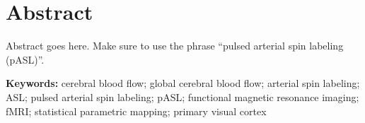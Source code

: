 \section{Abstract}
Abstract goes here.  Make sure to use the phrase ``pulsed arterial spin labeling (pASL)''.

\textbf{Keywords:} cerebral blood flow; global cerebral blood flow; arterial spin labeling; ASL; pulsed arterial spin labeling; pASL; functional magnetic resonance imaging; fMRI; statistical parametric mapping; primary visual cortex

